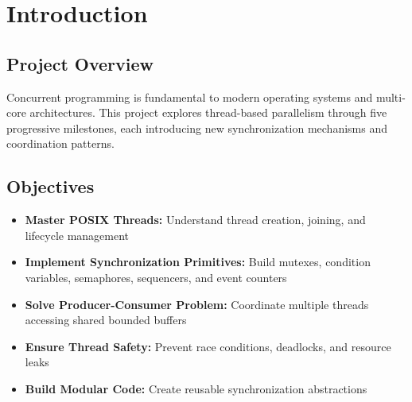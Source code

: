 \documentclass[12pt,a4paper]{article}
\begin{document}
\begin{abstract}
without degradation. The primitives and patterns developed form the foundation for numerous production systems including thread pools in web servers, event-driven architectures in asynchronous frameworks, multi-stage producer-consumer pipelines in data processing, monitor objects in concurrent databases, distributed coordination protocols, and real-time systems with deadline scheduling. This project demonstrates that complex concurrent systems can be reliably constructed through systematic composition of well-tested synchronization primitives, providing practical experience with patterns applicable across embedded devices, server applications, and distributed computing platforms.
\end{abstract}

\clearpage

\setcounter{tocdepth}{2}
\tableofcontents
\clearpage


\section{Introduction}

\subsection{Project Overview}
Concurrent programming is fundamental to modern operating systems and multi-core architectures. This project explores thread-based parallelism through five progressive milestones, each introducing new synchronization mechanisms and coordination patterns.

\subsection{Objectives}
\begin{itemize}[leftmargin=*]
    \item \textbf{Master POSIX Threads:} Understand thread creation, joining, and lifecycle management
    \item \textbf{Implement Synchronization Primitives:} Build mutexes, condition variables, semaphores, sequencers, and event counters
    \item \textbf{Solve Producer-Consumer Problem:} Coordinate multiple threads accessing shared bounded buffers
    \item \textbf{Ensure Thread Safety:} Prevent race conditions, deadlocks, and resource leaks
    \item \textbf{Build Modular Code:} Create reusable synchronization abstractions
\end{itemize}
\end{document}
